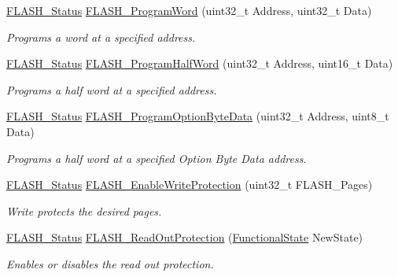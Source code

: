 \begin{DoxyCompactItemize}
\hyperlink{group___f_l_a_s_h___exported___types_gadc63a6f3404ff1f71229a66915e9cdc0}{F\+L\+A\+S\+H\+\_\+\+Status} \hyperlink{group___f_l_a_s_h___private___functions_gaac9a2f400b92537bd42a6bd7cc237b11}{F\+L\+A\+S\+H\+\_\+\+Program\+Word} (uint32\+\_\+t Address, uint32\+\_\+t Data)
\begin{DoxyCompactList}\small\item\em Programs a word at a specified address. \end{DoxyCompactList}\item 
\hyperlink{group___f_l_a_s_h___exported___types_gadc63a6f3404ff1f71229a66915e9cdc0}{F\+L\+A\+S\+H\+\_\+\+Status} \hyperlink{group___f_l_a_s_h___private___functions_ga5c1336f667950a8765887228f1d0d501}{F\+L\+A\+S\+H\+\_\+\+Program\+Half\+Word} (uint32\+\_\+t Address, uint16\+\_\+t Data)
\begin{DoxyCompactList}\small\item\em Programs a half word at a specified address. \end{DoxyCompactList}\item 
\hyperlink{group___f_l_a_s_h___exported___types_gadc63a6f3404ff1f71229a66915e9cdc0}{F\+L\+A\+S\+H\+\_\+\+Status} \hyperlink{group___f_l_a_s_h___private___functions_ga1382ff9d4ded8a5c076fde4fff529d21}{F\+L\+A\+S\+H\+\_\+\+Program\+Option\+Byte\+Data} (uint32\+\_\+t Address, uint8\+\_\+t Data)
\begin{DoxyCompactList}\small\item\em Programs a half word at a specified Option Byte Data address. \end{DoxyCompactList}\item 
\hyperlink{group___f_l_a_s_h___exported___types_gadc63a6f3404ff1f71229a66915e9cdc0}{F\+L\+A\+S\+H\+\_\+\+Status} \hyperlink{group___f_l_a_s_h___private___functions_gabad10c15e2d1ff1cb9e1083d08a9e763}{F\+L\+A\+S\+H\+\_\+\+Enable\+Write\+Protection} (uint32\+\_\+t F\+L\+A\+S\+H\+\_\+\+Pages)
\begin{DoxyCompactList}\small\item\em Write protects the desired pages. \end{DoxyCompactList}\item 
\hyperlink{group___f_l_a_s_h___exported___types_gadc63a6f3404ff1f71229a66915e9cdc0}{F\+L\+A\+S\+H\+\_\+\+Status} \hyperlink{group___f_l_a_s_h___private___functions_ga0b8d1a8277950c890bbc247bbeafb40f}{F\+L\+A\+S\+H\+\_\+\+Read\+Out\+Protection} (\hyperlink{group___exported__types_gac9a7e9a35d2513ec15c3b537aaa4fba1}{Functional\+State} New\+State)
\begin{DoxyCompactList}\small\item\em Enables or disables the read out protection. \end{DoxyCompactList}\item 

\end{DoxyCompactItemize}
